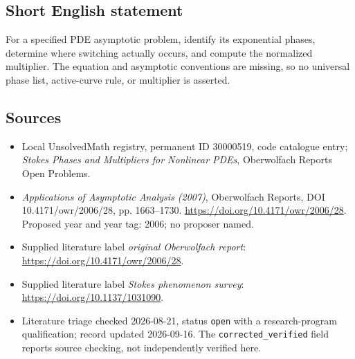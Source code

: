 \documentclass[11pt]{article}
\begin{document}
\subsection{Short English statement}
For a specified PDE asymptotic problem, identify its exponential phases, determine where switching actually occurs, and compute the normalized multiplier. The equation and asymptotic conventions are missing, so no universal phase list, active-curve rule, or multiplier is asserted.
\subsection{Sources}
\begin{itemize}\item Local UnsolvedMath registry, permanent ID 30000519, code catalogue entry; \emph{Stokes Phases and Multipliers for Nonlinear PDEs}, Oberwolfach Reports Open Problems.\item \emph{Applications of Asymptotic Analysis (2007)}, Oberwolfach Reports, DOI 10.4171/owr/2006/28, pp. 1663--1730. \url{https://doi.org/10.4171/owr/2006/28}. Proposed year and year tag: 2006; no proposer named.\item Supplied literature label \emph{original Oberwolfach report}: \url{https://doi.org/10.4171/owr/2006/28}.\item Supplied literature label \emph{Stokes phenomenon survey}: \url{https://doi.org/10.1137/1031090}.\item Literature triage checked 2026-08-21, status \texttt{open} with a research-program qualification; record updated 2026-09-16. The \texttt{corrected\_verified} field reports source checking, not independently verified here.\end{itemize}
\end{document}
